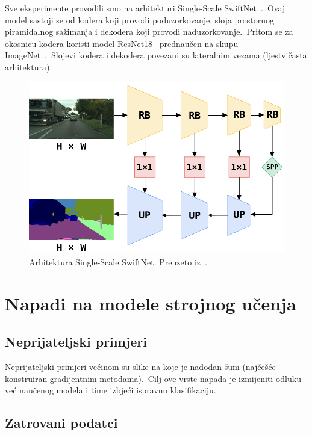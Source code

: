 \documentclass[times, utf8, seminar, numeric]{fer}
\begin{document}
Sve eksperimente provodili smo na arhitekturi Single-Scale SwiftNet~\cite{orvsic2021efficient}.\ Ovaj model sastoji se od kodera koji provodi poduzorkovanje, sloja prostornog piramidalnog sažimanja i dekodera koji provodi naduzorkovanje.\ 
Pritom se za okosnicu kodera koristi model ResNet18~\cite{he2016deep} prednaučen na skupu ImageNet~\cite{deng2009imagenet}.\ Slojevi kodera i dekodera povezani su lateralnim vezama (ljestvičasta arhitektura).\

\begin{figure}[htb]
    \centering
    \includegraphics[scale=0.425]{./Slike/swiftnet.png}
    \caption{Arhitektura Single-Scale SwiftNet. Preuzeto iz~\cite{orvsic2021efficient}.}
    \label{fig:swiftnet}
\end{figure}

\chapter{Napadi na modele strojnog učenja}

\section{Neprijateljski primjeri}

Neprijateljski primjeri većinom su slike na koje je nadodan šum (najčešće konstruiran gradijentnim metodama).\ Cilj ove vrste napada je izmijeniti odluku već naučenog modela i time izbjeći ispravnu klasifikaciju.

\section{Zatrovani podatci}
\end{document}
